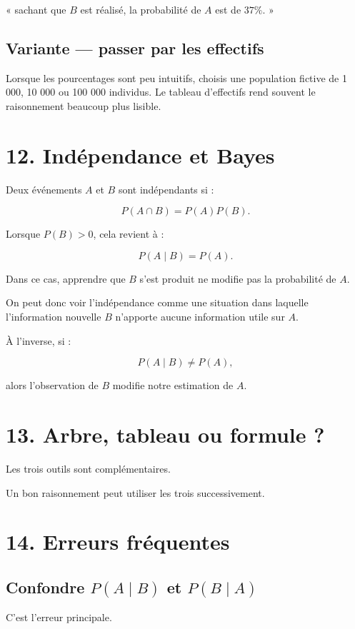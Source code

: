 {{« sachant que $B$ est réalisé, la probabilité de $A$ est de $37\%$. »

\subsection{Variante — passer par les effectifs}

Lorsque les pourcentages sont peu intuitifs, choisis une population fictive de 1 000, 10 000 ou 100 000 individus. Le tableau d'effectifs rend souvent le raisonnement beaucoup plus lisible.


\section{12. Indépendance et Bayes}

Deux événements $A$ et $B$ sont indépendants si :

\[
P(A\cap B)=P(A)P(B).
\]

Lorsque $P(B)>0$, cela revient à :

\[
P(A\mid B)=P(A).
\]

Dans ce cas, apprendre que $B$ s'est produit ne modifie pas la probabilité de $A$.

On peut donc voir l'indépendance comme une situation dans laquelle l'information nouvelle $B$ n'apporte aucune information utile sur $A$.

À l'inverse, si :

\[
P(A\mid B)\neq P(A),
\]

alors l'observation de $B$ modifie notre estimation de $A$.


\section{13. Arbre, tableau ou formule ?}

Les trois outils sont complémentaires.


Un bon raisonnement peut utiliser les trois successivement.


\section{14. Erreurs fréquentes}

\subsection{Confondre $P(A\mid B)$ et $P(B\mid A)$}

C'est l'erreur principale.

}}
